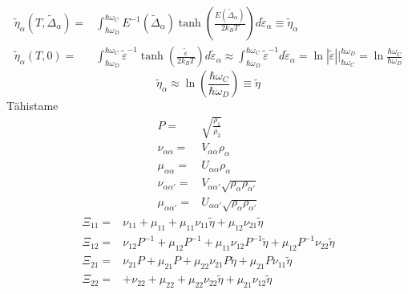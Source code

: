 \documentclass[class=article, crop=false]{standalone}
\begin{document}
\begin{equation}\label{key}
	\begin{split}
		\tilde{ \eta}_{ \alpha} \left( T, \tilde{ \Delta}_{ \alpha} \right) = & \int_{ \hbar \omega_{D}}^{ \hbar \omega_{C}} E^{-1} ( \tilde{ \Delta}_{ \alpha}) \tanh \left( \frac{E ( \tilde{ \Delta}_{ \alpha})}{2 k_{B} T} \right) d \tilde{ \varepsilon}_{ \alpha} \equiv \tilde{ \eta}_{ \alpha} \\
		\tilde{ \eta}_{ \alpha} \left( T, 0 \right) = & \int_{ \hbar \omega_{D}}^{ \hbar \omega_{C}} \tilde{ \varepsilon}^{-1} \tanh \left( \frac{ \tilde{ \varepsilon}}{2 k_{B} T} \right) d \tilde{ \varepsilon}_{ \alpha} \approx \int_{ \hbar \omega_{D}}^{ \hbar \omega_{C}} \tilde{ \varepsilon}^{-1} d \tilde{ \varepsilon}_{ \alpha} = \ln | \tilde{ \varepsilon}| \Bigr|_{ \hbar \omega_{C}}^{ \hbar \omega_{D}} = \ln \frac{ \hbar \omega_{C}}{ \hbar \omega_{D}}
	\end{split}
\end{equation}
\begin{equation}\label{key}
	\tilde{ \eta}_{ \alpha} \approx \ln \left( \frac{ \hbar \omega_{C}}{\hbar \omega_{D}}\right) \equiv \tilde{ \eta}
\end{equation}
Tähistame
\begin{equation}\label{InteraktsiooniKonstantideTähistus}
	 \begin{split}
	 	P = & \sqrt{ \frac{ \rho_{ 1}}{ \rho_{2}}} \\
	 	\nu_{ \alpha \alpha} = & V_{ \alpha \alpha} \rho_{ \alpha} \\
	 	\mu_{ \alpha \alpha} = & U_{ \alpha \alpha} \rho_{ \alpha} \\
	 	\nu_{ \alpha \alpha'} = & V_{ \alpha \alpha'} \sqrt{ \rho_{ \alpha} \rho_{ \alpha'}} \\
	 	\mu_{ \alpha \alpha'} = & U_{ \alpha \alpha'} \sqrt{ \rho_{ \alpha} \rho_{ \alpha'}}
	 \end{split}
\end{equation}
\begin{equation}\label{key}
	\begin{split}
		\Xi_{11} = & \nu_{11} + \mu_{11} + \mu_{11} \nu_{11} \tilde{ \eta} + \mu_{12} \nu_{21} \tilde{ \eta} \\
		\Xi_{12} = & \nu_{12} P^{-1} + \mu_{12} P^{-1} + \mu_{11} \nu_{12} P^{-1} \tilde{ \eta} + \mu_{12} P^{-1} \nu_{22} \tilde{ \eta} \\
		\Xi_{21} = & \nu_{21} P + \mu_{21} P + \mu_{22} \nu_{21} P \tilde{ \eta} + \mu_{21} P \nu_{11} \tilde{ \eta} \\
		\Xi_{22} = & + \nu_{22} + \mu_{22} + \mu_{22} \nu_{22} \tilde{ \eta} + \mu_{21} \nu_{12} \tilde{ \eta}
	\end{split}
\end{equation}
\end{document}
